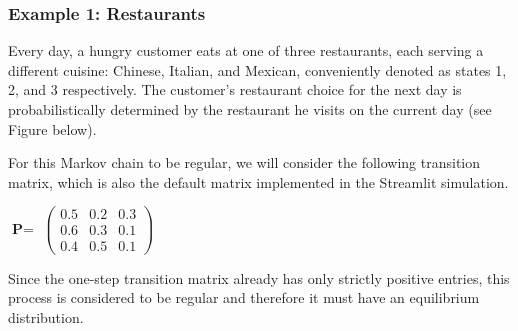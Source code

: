 \documentclass[a4paper, 12pt]{article}
\begin{document}
\begin{tcolorbox}
\subsubsection*{Example 1: Restaurants}
	Every day, a hungry customer eats at one of three restaurants, each serving a different cuisine: Chinese, Italian, and Mexican, 		conveniently denoted as states 1, 2, and 3 respectively.
	The customer's restaurant choice for the next day is probabilistically determined by the restaurant he visits on the current day (see Figure below).
\end{tcolorbox}
	\begin{center}
	\end{center}

For this Markov chain to be regular, we will consider the following transition matrix, which is also the default matrix implemented in the Streamlit simulation.

	\begin{center}	
	$\textbf{P}=$
           $\begin{pmatrix}
                0.5 & 0.2 & 0.3 \\
                0.6 & 0.3 & 0.1 \\
                0.4 & 0.5 & 0.1
            \end{pmatrix}$
	\end{center}

Since the one-step transition matrix already has only strictly positive entries, this process is considered to be regular and therefore it must have an equilibrium distribution.\\
\end{document}
